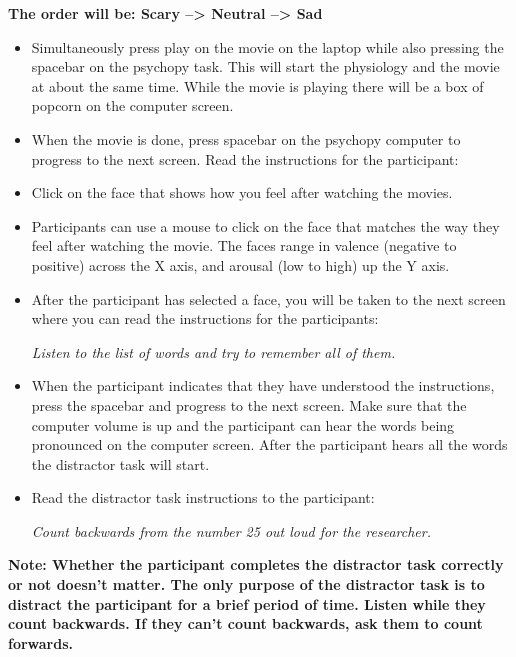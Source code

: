 \documentclass[]{book}
\begin{document}
\textbf{The order will be: Scary --\textgreater{} Neutral --\textgreater{} Sad}

\begin{itemize}
\item
  Simultaneously press play on the movie on the laptop while also pressing the spacebar on the psychopy task. This will start the physiology and the movie at about the same time. While the movie is playing there will be a box of popcorn on the computer screen.
\item
  When the movie is done, press spacebar on the psychopy computer to progress to the next screen. Read the instructions for the participant:
\item
  Click on the face that shows how you feel after watching the movies.
\item
  Participants can use a mouse to click on the face that matches the way they feel after watching the movie. The faces range in valence (negative to positive) across the X axis, and arousal (low to high) up the Y axis.
\item
  After the participant has selected a face, you will be taken to the next screen where you can read the instructions for the participants:

  \emph{Listen to the list of words and try to remember all of them.}
\item
  When the participant indicates that they have understood the instructions, press the spacebar and progress to the next screen. Make sure that the computer volume is up and the participant can hear the words being pronounced on the computer screen. After the participant hears all the words the distractor task will start.
\item
  Read the distractor task instructions to the participant:

  \emph{Count backwards from the number 25 out loud for the researcher.}
\end{itemize}

\textbf{Note: Whether the participant completes the distractor task correctly or not doesn't matter. The only purpose of the distractor task is to distract the participant for a brief period of time. Listen while they count backwards. If they can't count backwards, ask them to count forwards.}
\end{document}

